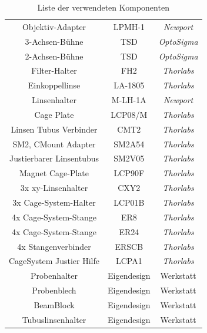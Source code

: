 \documentclass[titlepage]{article}
\begin{document}
\begin{table}[h!]
\begin{tabular}{|c|c|c|}
			Objektiv-Adapter         & LPMH-1                         & \textit{Newport}                       \\
			3-Achsen-Bühne           & TSD                            & \textit{OptoSigma}                     \\
			2-Achsen-Bühne           & TSD                            & \textit{OptoSigma}                     \\
			Filter-Halter            & FH2                            & \textit{Thorlabs}                      \\
			Einkoppellinse           & LA-1805                        & \textit{Thorlabs}                      \\
			Linsenhalter             & M-LH-1A                        & \textit{Newport}                       \\
			Cage Plate               & LCP08/M                        & \textit{Thorlabs}                      \\
			Linsen Tubus Verbinder   & CMT2                           & \textit{Thorlabs}                      \\
			SM2, CMount Adapter      & SM2A54                         & \textit{Thorlabs}                      \\
			Justierbarer Linsentubus & SM2V05                         & \textit{Thorlabs}                      \\
			Magnet Cage-Plate        & LCP90F                         & \textit{Thorlabs}                      \\
			3x xy-Linsenhalter       & CXY2                           & \textit{Thorlabs}                      \\
			3x Cage-System-Halter    & LCP01B                         & \textit{Thorlabs}                      \\
			4x Cage-System-Stange    & ER8                            & \textit{Thorlabs}                      \\
			4x Cage-System-Stange    & ER24                           & \textit{Thorlabs}                      \\
			4x Stangenverbinder      & ERSCB                          & \textit{Thorlabs}                      \\
			CageSystem Justier Hilfe & LCPA1                          & \textit{Thorlabs}                      \\		
			Probenhalter		     & Eigendesign                    & Werkstatt                              \\
			Probenblech              & Eigendesign                    & Werkstatt                              \\
			BeamBlock                & Eigendesign                    & Werkstatt                              \\
			Tubuslinsenhalter        & Eigendesign                    & Werkstatt                              \\
			\hline          
		\end{tabular}
		\caption{Liste der verwendeten Komponenten}
	\end{table}
	
	
\end{document}
